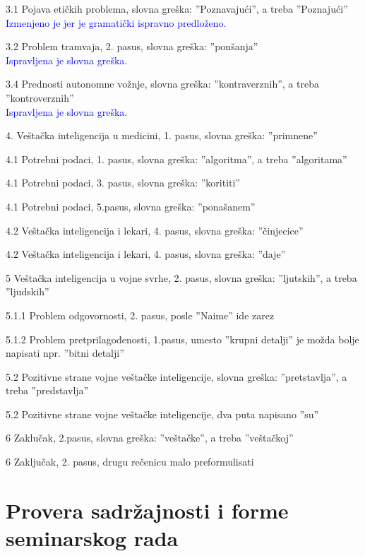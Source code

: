 \documentclass[a4paper]{report}
\newcommand{\odgovor}[1]{\textcolor{blue}{#1}}
\begin{document}
3.1 Pojava etičkih problema, slovna greška: ''Poznavajući'', a treba ''Poznajući'' \\
\odgovor{Izmenjeno je jer je gramatički ispravno predloženo.}

3.2 Problem tramvaja, 2. pasus, slovna greška: ''ponšanja'' \\
\odgovor{Ispravljena je slovna greška.}

3.4 Prednosti autonomne vožnje, slovna greška: ''kontraverznih'', a treba ''kontroverznih'' \\
\odgovor{Ispravljena je slovna greška.}

4. Veštačka inteligencija u medicini, 1. pasus, slovna greška: ''primnene''

4.1 Potrebni podaci, 1. pasus, slovna greška: ''algoritma'', a treba ''algoritama''

4.1 Potrebni podaci, 3. pasus, slovna greška: ''korititi''

4.1 Potrebni podaci, 5.pasus, slovna greška: ''ponašanem''

4.2 Veštačka inteligencija i lekari, 4. pasus, slovna greška: ''činjecice''

4.2 Veštačka inteligencija i lekari, 4. pasus, slovna greška: ''daje''

5 Veštačka inteligencija u vojne svrhe, 2. pasus, slovna greška: ''ljutskih'', a treba ''ljudskih''

5.1.1 Problem odgovornosti, 2. pasus, posle ''Naime'' ide zarez

5.1.2 Problem pretprilagođenosti, 1.pasus, umesto ''krupni detalji'' je možda bolje napisati npr. ''bitni detalji''

5.2 Pozitivne strane vojne veštačke inteligencije, slovna greška: ''pretstavlja'', a treba ''predstavlja''

5.2 Pozitivne strane vojne veštačke inteligencije, dva puta napisano ''su''

6 Zaklučak, 2.pasus, slovna greška: ''veštačke'', a treba ''veštačkoj''

6 Zaključak, 2. pasus, drugu rečenicu malo preformulisati

\section{Provera sadržajnosti i forme seminarskog rada}
\end{document}
